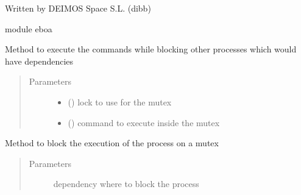 Written by DEIMOS Space S.L. (dibb)

module eboa

\begin{fulllineitems}
\label{\detokenize{eboa.triggering:eboa.triggering.eboa_triggering.block_and_execute_command}}
Method to execute the commands while blocking other processes which would have dependencies
\begin{quote}\begin{description}
\item[{Parameters}] \leavevmode\begin{itemize}
\item {} 
 () \textendash{} lock to use for the mutex

\item {} 
 () \textendash{} command to execute inside the mutex

\end{itemize}

\end{description}\end{quote}

\end{fulllineitems}


\begin{fulllineitems}
\label{\detokenize{eboa.triggering:eboa.triggering.eboa_triggering.block_process}}
Method to block the execution of the process on a mutex
\begin{quote}\begin{description}
\item[{Parameters}] \leavevmode
{} \textendash{} dependency where to block the process

\end{description}\end{quote}

\end{fulllineitems}

